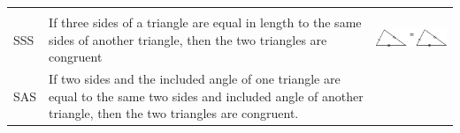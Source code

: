 \begin{center}
\begin{xtabular*}{\mytablewidth}[t]{|p{10\mystarwidth}|p{10\mystarwidth}|p{10\mystarwidth}|}
\begin{center}
    \vspace{.1in}
    \end{center}    
     \tabularnewline{}
        SSS &
        If three sides of a triangle are equal in length to the same sides of another triangle, then the two triangles are congruent &
    \setcounter{subfigure}{0}
\label{m39368*id318107}
    \begin{center}
    \label{m39368*id318107!!!underscore!!!media}\label{m39368*id318107!!!underscore!!!printimage}\includegraphics{col11306.imgs/m39368_MG10C13_032.png} %
      \vspace{2pt}
    \vspace{.1in}
    \end{center}    
     \tabularnewline{}
        SAS &
        If two sides and the included angle of one triangle are equal to the same two sides and included angle of another triangle, then the two triangles are congruent. &

\end{xtabular*}
\end{center}
